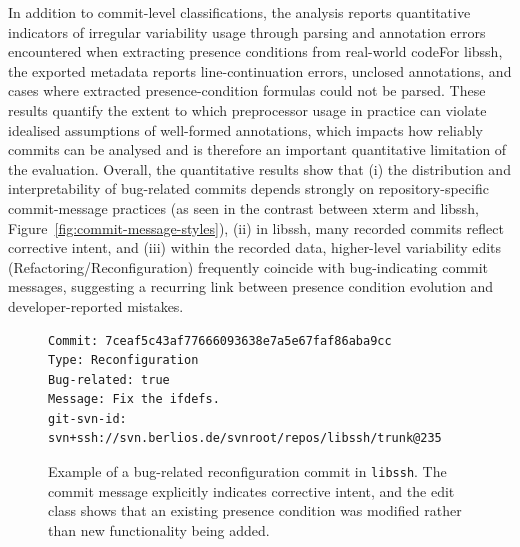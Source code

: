 In addition to commit-level classifications, the analysis reports quantitative indicators of irregular variability usage through parsing and annotation errors encountered when extracting presence conditions from real-world codeFor libssh, the exported metadata reports line-continuation errors, unclosed annotations, and cases where extracted presence-condition formulas could not be parsed. These results quantify the extent to which preprocessor usage in practice can violate idealised assumptions of well-formed annotations, which impacts how reliably commits can be analysed and is therefore an important quantitative limitation of the evaluation.
Overall, the quantitative results show that (i) the distribution and interpretability of bug-related commits depends strongly on repository-specific commit-message practices (as seen in the contrast between xterm and libssh, Figure~\ref{fig:commit-message-styles}), (ii) in libssh, many recorded commits reflect corrective intent, and (iii) within the recorded data, higher-level variability edits (Refactoring/Reconfiguration) frequently coincide with bug-indicating commit messages, suggesting a recurring link between presence condition evolution and developer-reported mistakes.


\begin{figure}[t]
\centering
\begin{minipage}{0.95\linewidth}
\begin{verbatim}
Commit: 7ceaf5c43af77666093638e7a5e67faf86aba9cc
Type: Reconfiguration
Bug-related: true
Message: Fix the ifdefs.
git-svn-id: svn+ssh://svn.berlios.de/svnroot/repos/libssh/trunk@235
\end{verbatim}
\end{minipage}
\caption{Example of a bug-related reconfiguration commit in \texttt{libssh}.
The commit message explicitly indicates corrective intent, and the edit class
shows that an existing presence condition was modified rather than new
functionality being added.}
\label{fig:libssh_bug_reconfig}
\end{figure}



